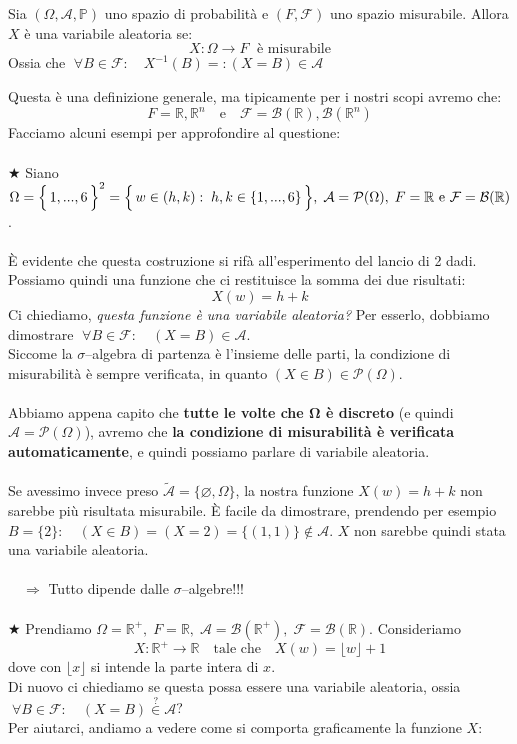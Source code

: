 \begin{definizione}[\faWarning]
    Sia $(\Omega, \mathcal{A}, \mathbb{P})$ uno spazio di probabilità e $(F, \mathcal{F})$ uno spazio misurabile. Allora $X$ è una variabile aleatoria se:
    \[X:\Omega\to F \;\text{ è misurabile}\]
    Ossia che $\;\forall B\in \mathcal{F}: \quad X^{-1}(B) =: (X = B)\in \mathcal{A}$
\end{definizione}
\noindent Questa è una definizione generale, ma tipicamente per i nostri scopi avremo che:
\[F = \mathbb{R}, \mathbb{R}^n\quad \text{e}\quad \mathcal{F} = \mathcal{B}(\mathbb{R}), \mathcal{B}(\mathbb{R}^n)\]
Facciamo alcuni esempi per approfondire al questione:\\
\\
\(\bigstar\) Siano $\Omega = \Bigl\{\,1, ..., 6\,\Bigr\}^2 = \Bigl\{\,w\in (h, k): \;h, k\in\{1, ..., 6\}\,\Bigr\}, \;\mathcal{A} = \mathcal{P}(\Omega), \;F = \mathbb{R} \text{ e } \mathcal{F} = \mathcal{B}(\mathbb{R})$.\\
\\
È evidente che questa costruzione si rifà all'esperimento del lancio di 2 dadi. Possiamo quindi una funzione che ci restituisce la somma dei due risultati:
\[X(w) = h + k\]
Ci chiediamo, \textit{questa funzione è una variabile aleatoria?} Per esserlo, dobbiamo dimostrare $\;\forall B\in \mathcal{F}: \quad (X = B)\in \mathcal{A}$. \\
Siccome la $\sigma$--algebra di partenza è l'insieme delle parti, la condizione di misurabilità è sempre verificata, in quanto $(X\in B)\in \mathcal{P}(\Omega)$.\\
\\
Abbiamo appena capito che \textbf{tutte le volte che $\boldsymbol{\Omega}$ è discreto} (e quindi $\mathcal{A} = \mathcal{P}(\Omega)$), avremo che \textbf{la condizione di misurabilità è verificata automaticamente}, e quindi possiamo parlare di variabile aleatoria.\\
\\
Se avessimo invece preso $\tilde{\mathcal{A}} = \{\varnothing, \Omega\}$, la nostra funzione $X(w) = h+k$ non sarebbe più risultata misurabile. È facile da dimostrare, prendendo per esempio $B = \{2\}: \quad (X\in B) = (X = 2) = \{(1, 1)\}\notin\mathcal{A}$. $X$ non sarebbe quindi stata una variabile aleatoria.\\
\\
\(\quad\Rightarrow\) Tutto dipende dalle $\sigma$--algebre!!!\\
\\
\(\bigstar\) Prendiamo $\Omega = \mathbb{R}^+, \;F = \mathbb{R}, \; \mathcal{A}= \mathcal{B}(\mathbb{R}^+), \; \mathcal{F}= \mathcal{B}(\mathbb{R})$. Consideriamo
\[X:\mathbb{R}^+\to\mathbb{R}\quad\text{tale che}\quad X(w) = \lfloor w \rfloor+1\]
dove con $\lfloor x \rfloor$ si intende la parte intera di $x$.\\
Di nuovo ci chiediamo se questa possa essere una variabile aleatoria, ossia $\;\forall B\in \mathcal{F}: \quad (X = B)\overset{?}{\in} \mathcal{A}$?\\
Per aiutarci, andiamo a vedere come si comporta graficamente la funzione $X$:

